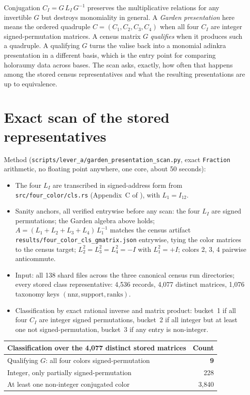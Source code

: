 \documentclass[11pt]{article}
\newcommand{\pathcode}[1]{\nolinkurl{#1}}
\begin{document}
Conjugation $C_I = G\,L_I\,G^{-1}$ preserves the multiplicative relations for
any invertible $G$ but destroys monomiality in general.  A \emph{Garden
presentation} here means the ordered quadruple
$C=(C_1,C_2,C_3,C_4)$ when all four $C_I$ are integer signed-permutation
matrices.  A census matrix $G$ \emph{qualifies} when it produces such a
quadruple.  A qualifying $G$ turns the valise back into a monomial adinkra
presentation in a different basis, which is the entry point for comparing
holoraumy data across bases.  The scan asks, exactly, how often that happens
among the stored census representatives and what the resulting presentations
are up to equivalence.

\section{Exact scan of the stored representatives}

Method (\pathcode{scripts/lever_a/garden_presentation_scan.py}, exact
\texttt{Fraction} arithmetic, no floating point anywhere, one core, about
50 seconds):

\begin{itemize}
  \item The four $L_I$ are transcribed in signed-address form from
        \pathcode{src/four_color/cls.rs}
        (Appendix~C of \cite{gates2024precis}), with $L_1 = I_{12}$.
  \item Sanity anchors, all verified entrywise before any scan: the four
        $L_I$ are signed permutations; the Garden algebra above holds;
        $A = (L_1+L_2+L_3+L_4)\,L_1^{-1}$ matches the census artifact
        \pathcode{results/four_color_cls_gmatrix.json} entrywise, tying the
        color matrices to the census target; $L_2^2 = L_3^2 = L_4^2 = -I$
        with $L_1^2 = +I$; colors 2, 3, 4 pairwise anticommute.
  \item Input: all 138 shard files across the three canonical census run
        directories; every stored class representative: 4{,}536 records,
        4{,}077 distinct matrices, 1{,}076 taxonomy keys
        $(\mathrm{nnz}, \mathrm{support}, \mathrm{ranks})$.
  \item Classification by exact rational inverse and matrix product:
        bucket~1 if all four $C_I$ are integer signed permutations, bucket~2
        if all integer but at least one not signed-permutation, bucket~3 if
        any entry is non-integer.
\end{itemize}

\begin{center}
\begin{tabular}{@{}lr@{}}
\toprule
Classification over the 4{,}077 distinct stored matrices & Count \\
\midrule
Qualifying $G$: all four colors signed-permutation & \textbf{9} \\
Integer, only partially signed-permutation & 228 \\
At least one non-integer conjugated color & 3{,}840 \\
\bottomrule
\end{tabular}
\end{center}
\end{document}
